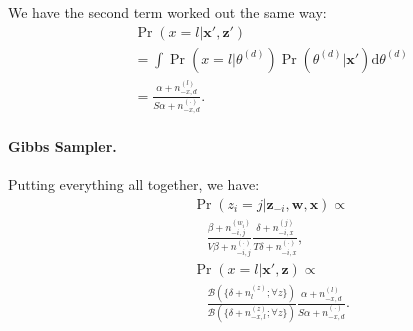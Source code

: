 
We have the second term worked out the same way:
\begin{eqnarray*}
  && \Pr(x = l|\mathbf{x}',\mathbf{z}') \\
  && = \int \Pr(x = l|\theta^{(d)}) \Pr(\theta^{(d)}|\mathbf{x}') \mathrm{d}\theta^{(d)} \\
  && = \frac{\alpha + n_{-x,d}^{(l)}}{S \alpha + n_{-x,d}^{(\cdot)}}.
\end{eqnarray*}

\paragraph{Gibbs Sampler.}  Putting everything all together, we have:
\begin{eqnarray}
  && \Pr(z_i = j|\mathbf{z}_{-i}, \mathbf{w}, \mathbf{x}) \propto \nonumber \\
  && \quad \frac{\beta + n_{-i,j}^{(w_i)}}{V \beta + n_{-i,j}^{(\cdot)}} 
  \frac{\delta + n_{-i,x}^{(j)}}{T \delta + n_{-i,x}^{(\cdot)}}, \\
  && \Pr(x = l|\mathbf{x}',\mathbf{z}) \propto \nonumber \\
  && \quad \frac{\mathcal{B}(\{\delta + n_l^{(z)}; \forall z\})}{\mathcal{B}(\{\delta + n_{-x,l}^{(z)}; \forall z\})}
  \frac{\alpha + n_{-x,d}^{(l)}}{S \alpha + n_{-x,d}^{(\cdot)}}.
\end{eqnarray}


